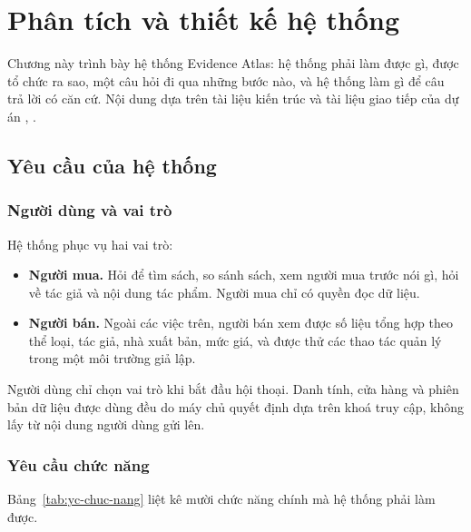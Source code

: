 \chapter{Phân tích và thiết kế hệ thống}
\label{ch:thiet-ke}

Chương này trình bày hệ thống Evidence Atlas: hệ thống phải làm được gì, được tổ chức ra sao, một câu hỏi đi qua những bước nào, và hệ thống làm gì để câu trả lời có căn cứ. Nội dung dựa trên tài liệu kiến trúc và tài liệu giao tiếp của dự án , .

\section{Yêu cầu của hệ thống}

\subsection{Người dùng và vai trò}

Hệ thống phục vụ hai vai trò:

\begin{itemize}
    \item \textbf{Người mua.} Hỏi để tìm sách, so sánh sách, xem người mua trước nói gì, hỏi về tác giả và nội dung tác phẩm. Người mua chỉ có quyền đọc dữ liệu.
    \item \textbf{Người bán.} Ngoài các việc trên, người bán xem được số liệu tổng hợp theo thể loại, tác giả, nhà xuất bản, mức giá, và được thử các thao tác quản lý trong một môi trường giả lập.
\end{itemize}

Người dùng chỉ chọn vai trò khi bắt đầu hội thoại. Danh tính, cửa hàng và phiên bản dữ liệu được dùng đều do máy chủ quyết định dựa trên khoá truy cập, không lấy từ nội dung người dùng gửi lên.

\subsection{Yêu cầu chức năng}

Bảng~\ref{tab:yc-chuc-nang} liệt kê mười chức năng chính mà hệ thống phải làm được.

